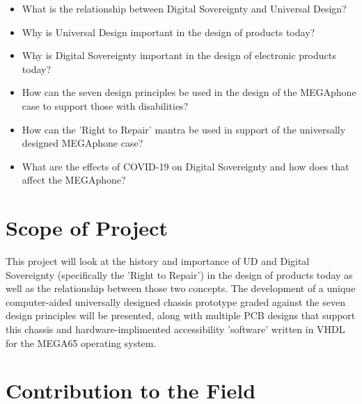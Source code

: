 \begin{itemize} 
    \item What is the relationship between Digital Sovereignty and Universal Design? %
    \item Why is Universal Design important in the design of products today?
    \item Why is Digital Sovereignty important in the design of electronic products today?
    \item How can the seven design principles be used in the design of the MEGAphone case to support those with disabilities?
    \item How can the 'Right to Repair' mantra be used in support of the universally designed MEGAphone case?
    \item What are the effects of COVID-19 on Digital Sovereignty and how does that affect the MEGAphone? %
\end{itemize}

\section{Scope of Project}

This project will look at the history and importance of UD and Digital Sovereignty (specifically the 'Right to Repair') in the design of products today as well as the relationship between those two concepts.
The development of a unique computer-aided universally designed chassis prototype graded against the seven design principles\cite{sevenprinciples} will be presented, along with multiple PCB designs that support this chassis and hardware-implimented accessibility 'software' written in VHDL for the MEGA65 operating system.

\section{Contribution to the Field} %

